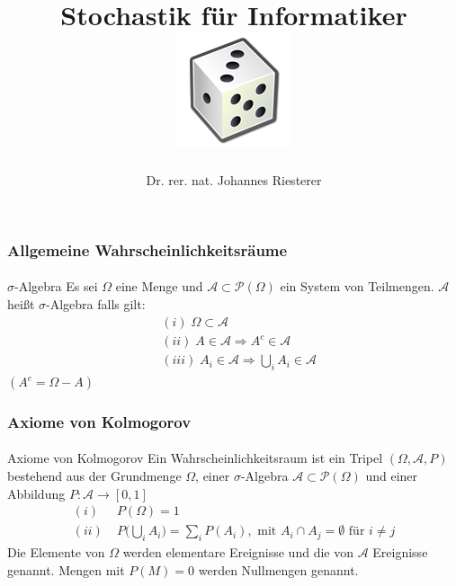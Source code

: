 \documentclass{beamer}
\begin{document}
\title[Stochastik] %
{Stochastik für Informatiker
\\
\includegraphics[scale=0.5]{img/craps}
}
\subtitle{}
\author[Dr. Johannes Riesterer] %
{Dr.  rer. nat. Johannes Riesterer}

\date[KPT 2004] %
{}

\subject{Stochastik}

\frame{\titlepage}

\begin{frame}
    \frametitle{Allgemeine Wahrscheinlichkeitsräume}
\framesubtitle{}

\begin{block}{$\sigma$-Algebra}
Es sei $\Omega$ eine Menge und $\mathcal{A} \subset  \mathcal{P}(\Omega)$ ein System von Teilmengen. $\mathcal{A}$ heißt $\sigma$-Algebra falls gilt:
\begin{align*}
& (i) \; \Omega \subset \mathcal{A} \\
& (ii) \; A \in \mathcal{A} \Rightarrow A^c \in \mathcal{A} \\
& (iii) \; A_i \in \mathcal{A} \Rightarrow \bigcup_i A_i \in \mathcal{A} 
\end{align*}
$(A^c = \Omega - A)$
\end{block}

 \end{frame}


\begin{frame}
    \frametitle{Axiome von Kolmogorov}
\framesubtitle{}
\begin{block}{Axiome von Kolmogorov}
Ein Wahrscheinlichkeitsraum ist ein Tripel $(\Omega, \mathcal{A}, P)$ bestehend aus der Grundmenge $\Omega$, einer $\sigma$-Algebra $\mathcal{A} \subset  \mathcal{P}(\Omega)$ und einer Abbildung
$P : \mathcal{A} \to [0,1]$
\begin{align*}
(i) & \; P(\Omega) = 1 \\
(ii) & \;  P \biggl(  \bigcup_i A_i  \biggr) = \sum_i P(A_i), \text{ mit } A_i \cap A_j = \emptyset \text{ für } i \neq j
\end{align*}
Die Elemente von $\Omega$ werden elementare Ereignisse und die von $\mathcal{A}$ Ereignisse genannt. Mengen mit $P(M) = 0$ werden Nullmengen genannt.
\end{block}
 \end{frame}
\end{document}
